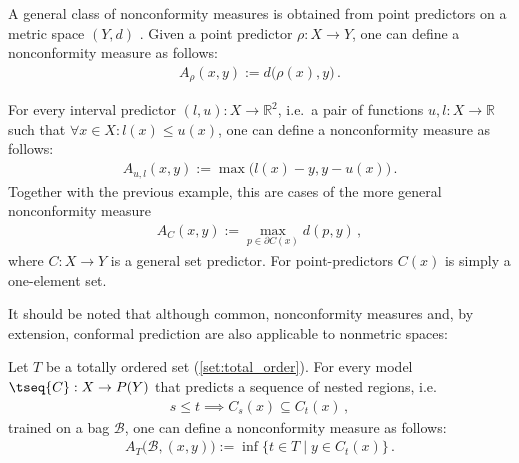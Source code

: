    \begin{example}
        A general class of nonconformity measures is obtained from point predictors on a metric space $(Y,d)$ . Given a point predictor $\rho:X\rightarrow Y$, one can define a nonconformity measure as follows:
        \begin{gather}
            A_\rho(x,y) := d\bigl(\rho(x),y\bigr)\,.
        \end{gather}
    \end{example}
    \begin{example}
        For every interval predictor $(l,u):X\rightarrow\mathbb{R}^2$, i.e.~a pair of functions $u,l:X\rightarrow\mathbb{R}$ such that $\forall x\in X:l(x)\leq u(x)$, one can define a nonconformity measure as follows:
        \begin{gather}
            A_{u,l}(x,y) := \max\bigl(l(x)-y,y-u(x)\bigr)\,.
        \end{gather}
        Together with the previous example, this are cases of the more general nonconformity measure
        \begin{gather}
            A_C(x,y) := \max_{p\in\partial C(x)}d(p,y)\,,
        \end{gather}
        where $C:X\rightarrow Y$ is a general set predictor. For point-predictors $C(x)$ is simply a one-element set.
    \end{example}

    It should be noted that although common, nonconformity measures and, by extension, conformal prediction are also applicable to nonmetric spaces:
    \begin{example}
        Let $T$ be a totally ordered set (\cref{set:total_order}). For every model $\tseq{C}:X\rightarrow P(Y)$ that predicts a sequence of nested regions, i.e.
        \begin{gather}
            s\leq t\implies C_s(x)\subseteq C_t(x)\,,
        \end{gather}
        trained on a bag $\mathcal{B}$, one can define a nonconformity measure as follows:
        \begin{gather}
            A_T\bigl(\mathcal{B},(x,y)\bigr) := \inf\{t\in T\mid y\in C_t(x)\}\,.
        \end{gather}
    \end{example}

